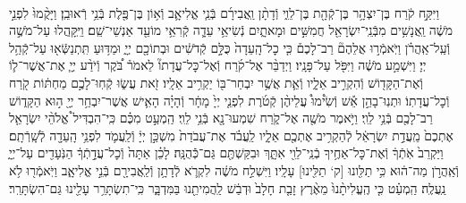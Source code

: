 \documentclass[twoside, openany, parskip=half, 11pt]{book}
\begin{document}
\begin{footnotesize}
\begin{multicols}{2}
\\
וַיִּקַּ֣ח קֹ֔רַח בֶּן־יִצְהָ֥ר בֶּן־קְֿהָ֖ת בֶּן־לֵוִ֑י וְֿדָתָ֨ן וַֽאֲבִירָ֜ם בְּֿנֵ֧י אֱלִיאָ֛ב וְֿא֥וֹן בֶּן־פֶּ֖לֶת בְּֿנֵ֥י רְֿאוּבֵֽן׃ וַיָּקֻ֨מוּ֙ לִפְנֵ֣י מֹשֶׁ֔ה וַֽאֲנָשִׁ֥ים מִבְּֿנֵֽי־יִשְׂרָאֵ֖ל חֲמִשִּׁ֣ים וּמָאתָ֑יִם נְֿשִׂיאֵ֥י עֵדָ֛ה קְֿרִאֵ֥י מוֹעֵ֖ד אַנְשֵׁי־שֵֽׁם׃ וַיִּֽקָּֽהֲלוּ עַל־מֹשֶׁ֣ה וְֿעַֽל־אַֽהֲרֹ֗ן וַיֹּֽאמְֿר֣וּ אֲלֵהֶם֘ רַב־לָכֶם֒ כִּ֤י כׇל־הָֽעֵדָה֙ כֻּלָּ֣ם קְֿדֹשִׁ֔ים וּבְתוֹכָ֖ם יְיָ֑ וּמַדּ֥וּעַ תִּֽתְנַשְּֿׂא֖וּ עַל־קְֿהַ֥ל יְיָ׃  וַיִּשְׁמַ֣ע מֹשֶׁ֔ה וַיִּפֹּ֖ל עַל־פָּנָֽיו׃ וַיְדַבֵּ֨ר אֶל־קֹ֜רַח וְֿאֶל־כׇּל־עֲדָתוֹ֘ לֵאמֹר֒ בֹּ֠קֶר וְֿיֹדַ֨ע יְיָ֧ אֶת־אֲשֶׁר־ל֛וֹ וְֿאֶת־הַקָּד֖וֹשׁ וְֿהִקְרִ֣יב אֵלָ֑יו וְֿאֵ֛ת אֲשֶׁ֥ר יִבְחַר־בּ֖וֹ יַקְרִ֥יב אֵלָֽיו׃ זֹ֖את עֲשׂ֑וּ קְֿחֽוּ־לָכֶ֣ם מַחְתּ֔וֹת קֹ֖רַח וְֿכׇל־עֲדָתֽוֹ׃ וּתְנֽוּ־בָהֵ֣ן אֵ֡שׁ וְֿשִׂ֩ימוּ֩ עֲלֵיהֶ֨ן קְֿטֹ֜רֶת לִפְנֵ֤י יְיָ֙ מָחָ֔ר וְֿהָיָ֗ה הָאִ֛ישׁ אֲשֶׁר־יִבְחַ֥ר יְיָ֖ ה֣וּא הַקָּד֑וֹשׁ רַב־לָכֶ֖ם בְּֿנֵ֥י לֵוִֽי׃  וַיֹּ֥אמֶר מֹשֶׁ֖ה אֶל־קֹ֑רַח שִׁמְעוּ־נָ֖א בְּֿנֵ֥י לֵוִֽי׃ הַֽמְעַ֣ט מִכֶּ֗ם כִּֽי־הִבְדִּיל֩ אֱלֹהֵ֨י יִשְׂרָאֵ֤ל אֶתְכֶם֙ מֵֽעֲדַ֣ת יִשְׂרָאֵ֔ל לְֿהַקְרִ֥יב אֶתְכֶ֖ם אֵלָ֑יו לַֽעֲבֹ֗ד אֶת־עֲבֹדַת֙ מִשְׁכַּ֣ן יְיָ֔ וְֿלַֽעֲמֹ֛ד לִפְנֵ֥י הָֽעֵדָ֖ה לְֿשָֽׁרְֿתָֽם׃ וַיַּקְרֵב֙ אֹֽתְֿךָ֔ וְֿאֶת־כׇּל־אַחֶ֥יךָ בְֿנֵֽי־לֵוִ֖י אִתָּ֑ךְ וּבִקַּשְׁתֶּ֖ם גַּם־כְּֿֿהֻנָּֽה׃ לָכֵ֗ן אַתָּה֙ וְֿכׇל־עֲדָ֣תְֿךָ֔ הַנֹּֽעָדִ֖ים עַל־יְיָ֑ וְֿאַֽהֲרֹ֣ן מַה־ה֔וּא כִּ֥י תַלִּ֖ונוּ [ק‘ תַלִּ֖ינוּ] עָלָֽיו׃ וַיִּשְׁלַ֣ח מֹשֶׁ֔ה לִקְרֹ֛א לְֿדָתָ֥ן וְֿלַֽאֲבִירָ֖ם בְּֿנֵ֣י אֱלִיאָ֑ב וַיֹּֽאמְֿר֖וּ לֹ֥א נַֽעֲלֶֽה׃ הַֽמְעַ֗ט כִּ֤י הֶֽעֱלִיתָ֨נוּ֙ מֵאֶ֨רֶץ זָבַ֤ת חָלָב֙ וּדְבַ֔שׁ לַֽהֲמִיתֵ֖נוּ בַּמִּדְבָּ֑ר כִּֽי־תִשְׂתָּרֵ֥ר עָלֵ֖ינוּ גַּם־הִשְׂתָּרֵֽר׃


\end{multicols}
\end{footnotesize}
\end{document}
